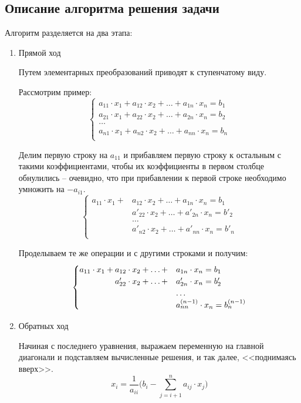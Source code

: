 \documentclass[14pt, a4paper]{extarticle}
\begin{document}
	\subsection{Описание алгоритма решения задачи}
		Алгоритм разделяется на два этапа:
		\begin{enumerate}
			\item Прямой ход
			
				Путем элементарных преобразований приводят к ступенчатому виду.
				
				Рассмотрим пример:
				\[ 
				\begin{cases}
					a_{11} \cdot x_1 + a_{12} \cdot x_2 + \ldots + a_{1n} \cdot x_n = b_1\\
					a_{21} \cdot x_1 + a_{22} \cdot x_2 + \ldots + a_{2n} \cdot x_n = b_2\\
					\ldots\\
					a_{n1} \cdot x_1 + a_{n2} \cdot x_2 + \ldots + a_{nn} \cdot x_n = b_n\\
				\end{cases}	
				\]
				
				Делим первую строку на $a_{11}$ и прибавляем первую строку к остальным с такими коэффициентами, чтобы их коэффициенты в первом столбце обнулились -- очевидно, что при прибавлении к первой строке необходимо умножить на $-a_{i1}$.
				\[ 
				\begin{cases}
					a_{11} \cdot x_1 +&a_{12} \cdot x_2 + \ldots + a_{1n} \cdot x_n = b_1\\
					&a'_{22} \cdot x_2 + \ldots + a'_{2n} \cdot x_n = b'_2\\
					&\ldots\\
					&a'_{n2} \cdot x_2 + \ldots + a'_{nn} \cdot x_n = b'_n\\
				\end{cases}	
				\]
				
				Проделываем те же операции и с другими строками и получим:
				\begin{align*}\begin{cases}
						a_{11} \cdot x_1 +a_{12} \cdot x_2 + \ldots + &a_{1n} \cdot x_n = b_1\\
						\hfill a'_{22} \cdot x_2 + \ldots + &a'_{2n} \cdot x_n = b'_2\\
						& \ldots\\
						\hfill &a^{(n-1)}_{nn} \cdot x_n = b^{(n-1)}_n\\
				\end{cases}\end{align*}	
			\item Обратных ход
			
				Начиная с последнего уравнения, выражаем переменную на главной диагонали и подставляем вычисленные решения, и так далее, <<поднимаясь вверх>>. 
				\[ x_i = \dfrac{1}{a_{ii}} \Bigg(b_i - \sum_{j=i+1}^{n} a_{ij}\cdot x_j\Bigg) \]
		\end{enumerate}
	
\end{document}
